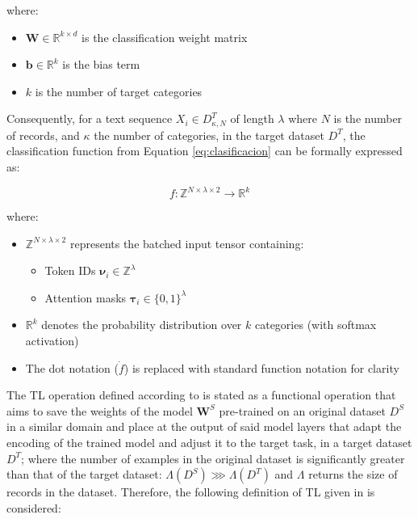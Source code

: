 \documentclass[onecolumn, journal, english, 12pt, a4paper]{IEEEtran} %
\theoremstyle{definition}
\begin{document}
where:
\begin{itemize}
  \item $\mathbf{W} \in \mathbb{R}^{k \times d}$ is the classification weight matrix
  \item $\mathbf{b} \in \mathbb{R}^k$ is the bias term
  \item $k$ is the number of target categories
\end{itemize}


Consequently, for a text sequence $X_i \in D^T_{\kappa, N}$ of length
$\lambda$ where $N$ is the number of records, and $\kappa$ the number
of categories, in the target dataset $D^T$, the classification
function from Equation \eqref{eq:clasificacion} can be formally
expressed as:

\begin{equation}\label{eq:tensor_mapping}
    f: \mathbb{Z}^{N \times \lambda \times 2} \to \mathbb{R}^k
\end{equation}

where:
\begin{itemize}
    \item $\mathbb{Z}^{N \times \lambda \times 2}$ represents the batched input tensor containing:
    \begin{itemize}
        \item Token IDs $\boldsymbol{\nu}_i \in \mathbb{Z}^\lambda$
        \item Attention masks $\boldsymbol{\tau}_i \in \{0,1\}^\lambda$
    \end{itemize}
    \item $\mathbb{R}^k$ denotes the probability distribution over $k$ categories (with softmax activation)
    \item The dot notation ($\dot{f}$) is replaced with standard function notation for clarity
\end{itemize}



  
The TL operation defined according to \textcite{falconi2020transfer}
is stated as a functional operation that aims to save the weights of
the model $\boldsymbol{W}^S$ pre-trained on an original dataset $D^S$
in a similar domain and place at the output of said model layers that
adapt the encoding of the trained model and adjust it to the target
task, in a target dataset $D^T$; where the number of examples in the
original dataset is significantly greater than that of the target
dataset: $\Lambda(D^S) \ggg \Lambda(D^T)$ and $\Lambda$ returns the
size of records in the dataset. Therefore, the following definition of
TL given in \cite{falconi2020transfer} is considered:
\end{document}

